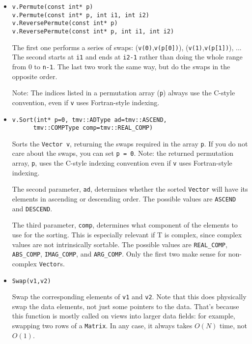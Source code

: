 \documentclass[twoside,letterpaper,11pt]{article}
\renewcommand{\tt}[1]{{\texttt {#1}}}
\begin{document}
\begin{itemize}
\item
\begin{verbatim}
v.Permute(const int* p)
v.Permute(const int* p, int i1, int i2)
v.ReversePermute(const int* p)
v.ReversePermute(const int* p, int i1, int i2)
\end{verbatim}
The first one performs a series of swaps: (\tt{v(0)},\tt{v(p[0])}), (\tt{v(1)},\tt{v(p[1])}), ... 
The second starts at \tt{i1} and ends at \tt{i2-1} rather than
doing the whole range from 0 to \tt{n-1}.
The last two work the same way, but do the swaps in the opposite order.

Note: The indices listed in a permutation array (\tt{p}) always use 
the C-style convention, even if \tt{v} uses Fortran-style indexing.

\item
\begin{verbatim}
v.Sort(int* p=0, tmv::ADType ad=tmv::ASCEND, 
      tmv::COMPType comp=tmv::REAL_COMP)
\end{verbatim}
Sorts the \tt{Vector~v}, returning the swaps required in the array \tt{p}.
If you do not care about the swaps, you can set \tt{p = 0}.
Note: the returned permutation array, \tt{p}, uses the C-style indexing convention
even if \tt{v} uses Fortran-style indexing.

The second parameter, \tt{ad}, determines whether the sorted \tt{Vector} 
will have its elements in ascending or descending order.  The possible values
are \tt{ASCEND} and \tt{DESCEND}. 

The third parameter, \tt{comp}, determines what component of the
elements to use for the sorting.  This is especially relevant if T is complex, 
since complex values are not intrinsically sortable.
The possible values are
\tt{REAL\_COMP}, \tt{ABS\_COMP},
\tt{IMAG\_COMP}, and \tt{ARG\_COMP}.
Only the first two make sense for non-complex \tt{Vector}s.  

\item
\begin{verbatim}
Swap(v1,v2)
\end{verbatim}
Swap the corresponding elements of \tt{v1} and \tt{v2}.  Note that this does physically
swap the data elements, not just some pointers to the data.  That's because this function
is mostly called on views into larger data fields: for example, swapping two rows of a 
\tt{Matrix}.  In any case, it always takes $O(N)$ time, not $O(1)$.

\end{itemize}
\end{document}
